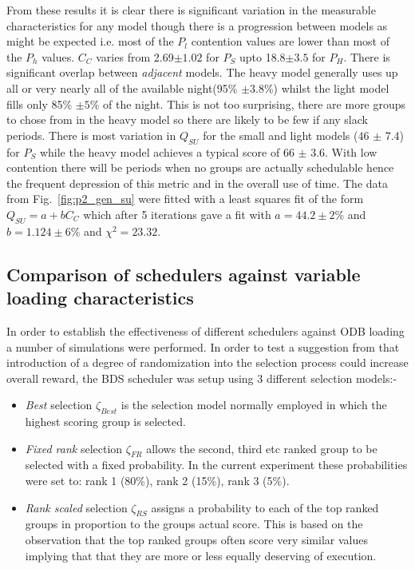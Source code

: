 From these results it is clear there is significant variation in the measurable characteristics for any model though there is a progression between models as might be expected i.e. most of the $P_l$ contention values are lower than most of the $P_h$ values. $C_C$ varies from 2.69$\pm 1.02$ for $P_S$ upto 18.8$\pm 3.5 $ for $P_H$. There is significant overlap between \emph{adjacent} models. The heavy model generally uses up all or very nearly all of the available night(95\% $\pm 3.8$\%) whilst the light model fills only 85\% $\pm 5$\% of the night. This is not too surprising, there are more groups to chose from in the heavy model so there are likely to be few if any slack periods. There is most variation in $Q_{SU}$ for the small and light models (46 $\pm$ 7.4) for $P_S$ while the heavy model achieves a typical score of 66 $\pm$ 3.6. With low contention there will be periods when no groups are actually schedulable hence the frequent depression of this metric and in the overall use of time. The data from Fig.~\ref{fig:p2_gen_su} were fitted with a least squares fit of the form $Q_{SU} = a + b C_C$ which after 5 iterations gave a fit with $a=44.2 \pm 2$\% and $b=1.124 \pm 6$\% and $\chi^2 = 23.32$.

\subsection{Comparison of schedulers against variable loading characteristics}
\label{sect:compsched}
In order to establish the effectiveness of different schedulers against ODB loading a number of simulations were performed.  In order to test a suggestion from \cite{cicirello02amplification} that introduction of a degree of randomization into the selection process could increase overall reward, the BDS scheduler was setup using 3 different selection models:- 
 
\begin{itemize}
\item \emph{Best} selection $\zeta_{Best}$ is the selection model normally employed in which the highest scoring group is selected.

\item \emph{Fixed rank} selection $\zeta_{FR}$ allows the second, third etc ranked group to be selected with a fixed probability. In the current experiment these probabilities were set to: rank 1 (80\%), rank 2 (15\%), rank 3 (5\%). 

\item \emph{Rank scaled} selection $\zeta_{RS}$ assigns a probability to each of the top ranked groups in proportion to the groups actual score. This is based on the observation that the top ranked groups often score very similar values implying that that they are more or less equally deserving of execution. 
\end{itemize}

